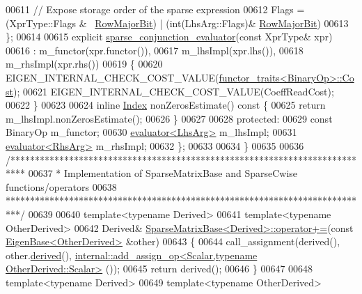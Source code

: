 \begin{DoxyCode}
00611     \textcolor{comment}{// Expose storage order of the sparse expression}
00612     Flags = (XprType::Flags & ~\hyperlink{group__flags_gae4f56c2a60bbe4bd2e44c5b19cbe8762}{RowMajorBit}) | (\textcolor{keywordtype}{int}(LhsArg::Flags)&
      \hyperlink{group__flags_gae4f56c2a60bbe4bd2e44c5b19cbe8762}{RowMajorBit})
00613   \};
00614   
00615   \textcolor{keyword}{explicit} \hyperlink{struct_eigen_1_1internal_1_1sparse__conjunction__evaluator}{sparse\_conjunction\_evaluator}(\textcolor{keyword}{const} XprType& xpr)
00616     : m\_functor(xpr.functor()),
00617       m\_lhsImpl(xpr.lhs()), 
00618       m\_rhsImpl(xpr.rhs())  
00619   \{
00620     EIGEN\_INTERNAL\_CHECK\_COST\_VALUE(\hyperlink{struct_eigen_1_1internal_1_1functor__traits}{functor\_traits<BinaryOp>::Cost});
00621     EIGEN\_INTERNAL\_CHECK\_COST\_VALUE(CoeffReadCost);
00622   \}
00623   
00624   \textcolor{keyword}{inline} \hyperlink{namespace_eigen_a62e77e0933482dafde8fe197d9a2cfde}{Index} nonZerosEstimate()\textcolor{keyword}{ const }\{
00625     \textcolor{keywordflow}{return} m\_lhsImpl.nonZerosEstimate();
00626   \}
00627 
00628 \textcolor{keyword}{protected}:
00629   \textcolor{keyword}{const} BinaryOp m\_functor;
00630   \hyperlink{struct_eigen_1_1internal_1_1evaluator}{evaluator<LhsArg>} m\_lhsImpl;
00631   \hyperlink{struct_eigen_1_1internal_1_1evaluator}{evaluator<RhsArg>} m\_rhsImpl;
00632 \};
00633 
00634 \}
00635 
00636 \textcolor{comment}{/***************************************************************************}
00637 \textcolor{comment}{* Implementation of SparseMatrixBase and SparseCwise functions/operators}
00638 \textcolor{comment}{***************************************************************************/}
00639 
00640 \textcolor{keyword}{template}<\textcolor{keyword}{typename} Derived>
00641 \textcolor{keyword}{template}<\textcolor{keyword}{typename} OtherDerived>
00642 Derived& \hyperlink{group___sparse_core___module_class_eigen_1_1_sparse_matrix_base}{SparseMatrixBase<Derived>::operator+=}(\textcolor{keyword}{const} 
      \hyperlink{group___core___module_struct_eigen_1_1_eigen_base}{EigenBase<OtherDerived>} &other)
00643 \{
00644   call\_assignment(derived(), other.\hyperlink{group___core___module_a324b16961a11d2ecfd2d1b7dd7946545}{derived}(), 
      \hyperlink{struct_eigen_1_1internal_1_1add__assign__op}{internal::add\_assign\_op<Scalar,typename OtherDerived::Scalar>}
      ());
00645   \textcolor{keywordflow}{return} derived();
00646 \}
00647 
00648 \textcolor{keyword}{template}<\textcolor{keyword}{typename} Derived>
00649 \textcolor{keyword}{template}<\textcolor{keyword}{typename} OtherDerived>

\end{DoxyCode}
